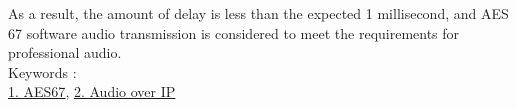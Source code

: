 As a result, the amount of delay is less than the expected 1 millisecond, and AES 67 software audio transmission is considered to meet the requirements for professional audio.
~ \\
Keywords : \\
\underline{1. AES67},
\underline{2. Audio over IP}
\begin{flushright}
\edept \\
\eauthor
\end{flushright}
